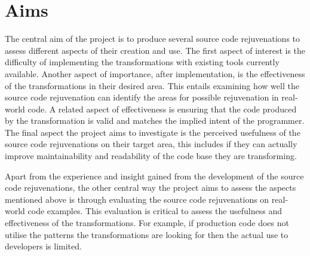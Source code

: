 \documentclass[bsc,frontabs,singlespacing,twoside,parskip,deptreport]{infthesis}
\begin{document}




    



\section{Aims} %
The central aim of the project is to produce several source code rejuvenations to assess different aspects of their creation and use. The first aspect of interest is the difficulty of implementing the transformations with existing tools currently available. Another aspect of importance, after implementation, is the effectiveness of the transformations in their desired area. This entails examining how well the source code rejuvenation can identify the areas for possible rejuvenation in real-world code. A related aspect of effectiveness is ensuring that the code produced by the transformation is valid and matches the implied intent of the programmer. The final aspect the project aims to investigate is the perceived usefulness of the source code rejuvenations on their target area, this includes if they can actually improve maintainability and readability of the code base they are transforming.

Apart from the experience and insight gained from the development of the source code rejuvenations, the other central way the project aims to assess the aspects mentioned above is through evaluating the source code rejuvenations on real-world code examples. This evaluation is critical to assess the usefulness and effectiveness of the transformations. For example, if production code does not utilise the patterns the transformations are looking for then the actual use to developers is limited.

\end{document}

